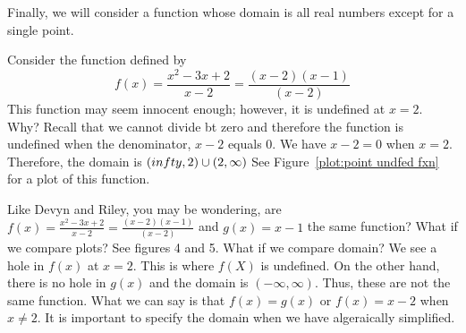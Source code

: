 \documentclass{ximera}
\begin{document}
Finally, we will consider a function whose domain is all real numbers
except for a single point.

\begin{example}
Consider the function defined by 
\[
f(x) = \frac{x^2 - 3x + 2}{x-2} = \frac{(x-2)(x-1)}{(x-2)}
\]
This function may seem innocent enough; however, it is undefined at
$x=2$. Why? Recall that we cannot divide bt zero and therefore the function is undefined when the denominator, $x-2$ equals $0$.  We have $x-2 = 0$ when $x=2$.  Therefore, the domain is $(\-infty ,2)\cup (2,\infty )$  
See Figure~\ref{plot:point undfed fxn} for a plot of this function.
\end{example}

Like Devyn and Riley, you may be wondering, are $f(x) = \frac{x^2 - 3x + 2}{x-2} = \frac{(x-2)(x-1)}{(x-2)}$ and $g(x) = x-1$ the same function?  What if we compare plots?  See figures 4 and 5.  What if we compare domain?  We see a hole in $f(x)$ at $x=2$.  This is where $f(X)$ is undefined.  On the other hand, there is no hole in $g(x)$ and the domain is $(-\infty ,\infty )$.  Thus, these are not the same function.  What we can say is that $f(x)=g(x)$ or $f(x)=x-2$ when $x \ne 2$.  It is important to specify the domain when we have algeraically simplified. 

\end{document}
